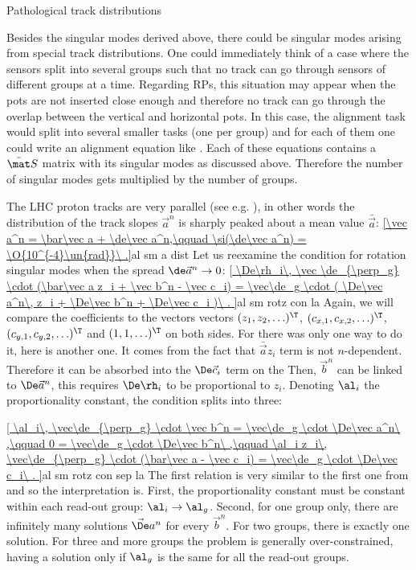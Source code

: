 \caption{Pathological track distributions}

Besides the singular modes derived above, there could be singular modes arising from special track distributions. One could immediately think of a case where the sensors split into several groups such that no track can go through sensors of different groups at a time. Regarding RPs, this situation may appear when the pots are not inserted close enough and therefore no track can go through the overlap between the vertical and horizontal pots. In this case, the alignment task would split into several smaller tasks (one per group) and for each of them one could write an alignment equation like . Each of these equations contains a $\tilde\mat S$ matrix with its singular modes as discussed above. Therefore the number of singular modes gets multiplied by the number of groups.

The LHC proton tracks are very parallel (see e.g. ), in other words the distribution of the track slopes $\vec a^n$ is sharply peaked about a mean value $\bar\vec a$:
\eqref{\vec a^n = \bar\vec a + \de\vec a^n,\qquad \si(\de\vec a^n) = \O{10^{-4}\un{rad}}\ .}{al sm a dist}
Let us reexamine the condition for rotation singular modes  when the spread $\de\vec a^n\to 0$:
\eqref{
	\De\rh_i\, \vec \de_{\perp_g} \cdot (\bar\vec a z_i + \vec b^n - \vec c_i) =
	\vec\de_g \cdot (
		\De\vec a^n\, z_i +
		\De\vec b^n +
		\De\vec c_i
	)\ .
}{al sm rotz con la}
Again, we will compare the coefficients to the vectors vectors $(z_1, z_2, \ldots)^\T$, $(c_{x,1}, c_{x,2}, \ldots)^\T$, $(c_{y,1}, c_{y,2},\ldots)^\T$ and $(1, 1, \ldots)^\T$ on both sides. For  there was only one way to do it, here is another one. It comes from the fact that $\bar\vec a z_i$ term is not $n$-dependent. Therefore it can be absorbed into the $\De\vec c_i$ term on the \rhs Then, $\vec b^n$ can be linked to $\De\vec a^n$, this requires $\De\rh_i$ to be proportional to $z_i$. Denoting $\al_i$ the proportionality constant, the condition splits into three:

\eqref{
	\al_i\, \vec\de_{\perp_g} \cdot \vec b^n = \vec\de_g \cdot \De\vec a^n\ ,\qquad
	0 = \vec\de_g \cdot \De\vec b^n\ ,\qquad
	\al_i z_i\, \vec\de_{\perp_g} \cdot (\bar\vec a - \vec c_i) = \vec\de_g \cdot \De\vec c_i\ .
}{al sm rotz con sep la}
The first relation is very similar to the first one from  and so the interpretation is. First, the proportionality constant must be constant within each read-out group: $\al_i\to \al_g$. Second, for one group only, there are infinitely many solutions $\vec\De a^n$ for every $\vec b^n$. For two groups, there is exactly one solution. For three and more groups the problem is generally over-constrained, having a solution only if $\al_g$ is the same for all the read-out groups.

